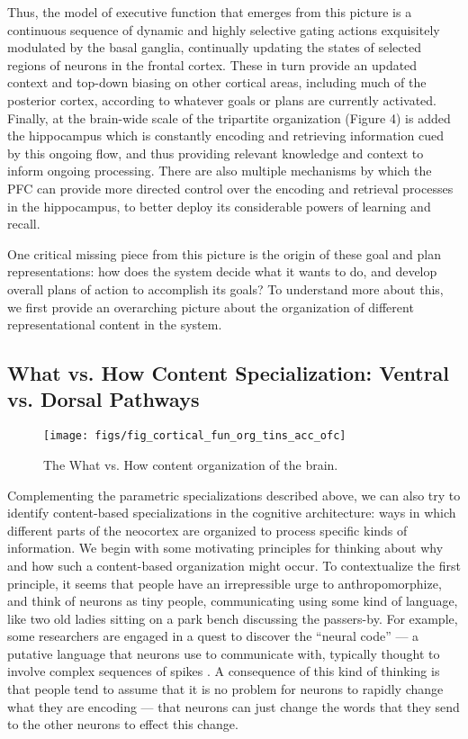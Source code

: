 \documentclass[11pt,twoside]{article}
\begin{document}
Thus, the model of executive function that emerges from this picture is a
continuous sequence of dynamic and highly selective gating actions exquisitely
modulated by the basal ganglia, continually updating the states of selected
regions of neurons in the frontal cortex. These in turn provide an updated
context and top-down biasing on other cortical areas, including much of the
posterior cortex, according to whatever goals or plans are currently
activated.  Finally, at the brain-wide scale of the tripartite organization
(Figure 4) is added the hippocampus which is constantly encoding and
retrieving information cued by this ongoing flow, and thus providing relevant
knowledge and context to inform ongoing processing.  There are also multiple
mechanisms by which the PFC can provide more directed control over the
encoding and retrieval processes in the hippocampus, to better deploy its
considerable powers of learning and recall.

One critical missing piece from this picture is the origin of these goal and
plan representations: how does the system decide what it
wants to do, and develop overall plans of action to accomplish its goals?  To
understand more about this, we first provide an overarching picture about the
organization of different representational content in the system.

\subsection{What vs. How Content Specialization: Ventral vs. Dorsal Pathways}

\begin{figure}

  \centering\texttt{[image: figs/fig\_cortical\_fun\_org\_tins\_acc\_ofc]}
  \caption{\small The What vs. How content organization of the brain.}
  \label{fig.what_how}
\end{figure}

Complementing the parametric specializations described above, we can also try
to identify content-based specializations in the cognitive architecture: ways
in which different parts of the neocortex are organized to process specific
kinds of information.  We begin with some motivating principles for thinking
about why and how such a content-based organization might occur.  To
contextualize the first principle, it seems that people have an irrepressible
urge to anthropomorphize, and think of neurons as tiny people, communicating
using some kind of language, like two old ladies sitting on a park bench
discussing the passers-by.  For example, some researchers are engaged in a quest
to discover the ``neural code'' --- a putative language that neurons use to
communicate with, typically thought to involve complex sequences of spikes
\cite[e.g., ]{RiekeWarlandDeRuyterVanSteveninckEtAl96}.  A consequence of this kind of thinking is that people
tend to assume that it is no problem for neurons to rapidly change what they
are encoding \cite[e.g.,]{Miller00,Duncan01} --- that neurons can just
change the words that they send to the other neurons to effect this change.
\end{document}
